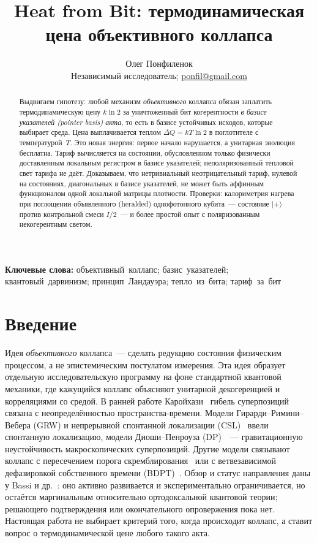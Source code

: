 \documentclass[11pt,a4paper]{article}
\title{\textbf{Heat from Bit: термодинамическая цена объективного коллапса}}
\author{%
  Олег Понфиленок\\[0.35em]%
  {\normalsize Независимый исследователь; \href{mailto:ponfil@gmail.com}{ponfil@gmail.com}}%
}
\date{}
\begin{document}
\pagecolor{black}
\color{fg}

\maketitle

\begin{abstract}
Выдвигаем гипотезу: любой механизм \emph{объективного} коллапса обязан заплатить термодинамическую цену $k\ln 2$ за уничтоженный бит когерентности \emph{в базисе указателей (pointer basis) акта}, то есть в базисе устойчивых исходов, которые выбирает среда. Цена выплачивается теплом $\Delta Q = kT\ln 2$ в поглотителе с температурой~$T$. Это новая энергия: первое начало нарушается, а унитарная эволюция бесплатна. Тариф вычисляется на состоянии, обусловленном только физически доставленным локальным регистром в базисе указателей; неполяризованный тепловой свет тарифа не даёт. Доказываем, что нетривиальный неотрицательный тариф, нулевой на состояниях, диагональных в базисе указателей, не может быть аффинным функционалом одной локальной матрицы плотности. Проверки: калориметрия нагрева при поглощении объявленного (heralded) однофотонного кубита~--- состояние $|{+}\rangle$ против контрольной смеси $I/2$~--- и более простой опыт с поляризованным некогерентным светом.
\end{abstract}

\noindent\textbf{Ключевые слова:} объективный~коллапс; базис~указателей; квантовый~дарвинизм; принцип~Ландауэра; тепло~из~бита; тариф~за~бит

\section{Введение}\label{sec:intro}

Идея \emph{объективного} коллапса~--- сделать редукцию состояния физическим процессом, а не эпистемическим постулатом измерения. Эта идея образует отдельную исследовательскую программу на фоне стандартной квантовой механики, где кажущийся коллапс объясняют унитарной декогеренцией и корреляциями со средой. В ранней работе Каройхази~\cite{karolyhazy1966} гибель суперпозиций связана с неопределённостью пространства-времени. Модели Гирарди--Римини--Вебера (GRW) и непрерывной спонтанной локализации (CSL)~\cite{grw1986,pearle1989} ввели спонтанную локализацию, модели Диоши--Пенроуза (DP)~\cite{diosi1989,penrose1996}~--- гравитационную неустойчивость макроскопических суперпозиций. Другие модели связывают коллапс с пересечением порога скремблирования~\cite{ponfilenok2026threshold} или с ветвезависимой дефазировкой собственного времени (BDPT)~\cite{ponfilenok2026branch}. Обзор и статус направления даны у Bassi и др.~\cite{bassi2013}: оно активно развивается и экспериментально ограничивается, но остаётся маргинальным относительно ортодоксальной квантовой теории; решающего подтверждения или окончательного опровержения пока нет. Настоящая работа не выбирает критерий того, когда происходит коллапс, а ставит вопрос о термодинамической цене любого такого акта.
\end{document}
